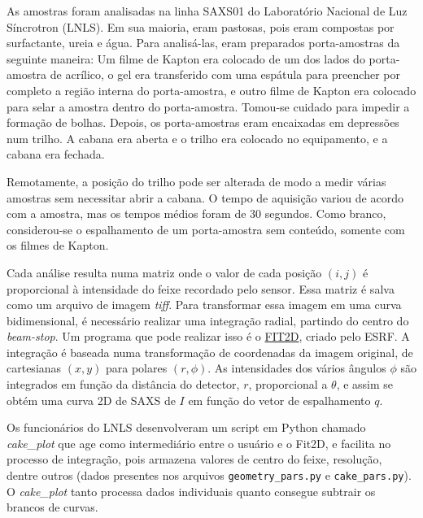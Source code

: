 			As amostras foram analisadas na linha SAXS01 do Laboratório Nacional de Luz Síncrotron (LNLS). Em sua maioria, eram pastosas, pois eram compostas por surfactante, ureia e água. Para analisá-las, eram preparados porta-amostras da seguinte maneira: Um filme de Kapton era colocado de um dos lados do porta-amostra de acrílico, o gel era transferido com uma espátula para preencher por completo a região interna do porta-amostra, e outro filme de Kapton era colocado para selar a amostra dentro do porta-amostra. Tomou-se cuidado para impedir a formação de bolhas. Depois, os porta-amostras eram encaixadas em depressões num trilho. A cabana era aberta e o trilho era colocado no equipamento, e a cabana era fechada. %
					
			Remotamente, a posição do trilho pode ser alterada de modo a medir várias amostras sem necessitar abrir a cabana. O tempo de aquisição variou de acordo com a amostra, mas os tempos médios foram de 30 segundos. Como branco, considerou-se o espalhamento de um porta-amostra sem conteúdo, somente com os filmes de Kapton.
			
			Cada análise resulta numa matriz onde o valor de cada posição \((i, j)\) é proporcional à intensidade do feixe recordado pelo sensor. Essa matriz é salva como um arquivo de imagem \emph{tiff}. Para transformar essa imagem em uma curva bidimensional, é necessário realizar uma integração radial, partindo do centro do \emph{beam-stop}. Um programa que pode realizar isso é o \href{http://www.esrf.eu/computing/scientific/FIT2D/windows.html}{FIT2D}, criado pelo ESRF. A integração é baseada numa transformação de coordenadas da imagem original, de cartesianas \((x, y)\) para polares \((r, \phi)\). As intensidades dos vários ângulos \(\phi\) são integrados em função da distância do detector, \(r\), proporcional a \(\theta\), e assim se obtém uma curva 2D de SAXS de \(I\) em função do vetor de espalhamento \(q\). 
			
			Os funcionários do LNLS desenvolveram um script em Python chamado \emph{cake\_plot} que age como intermediário entre o usuário e o Fit2D, e facilita no processo de integração, pois armazena valores de centro do feixe, resolução, dentre outros (dados presentes nos arquivos \texttt{geometry\_pars.py} e \texttt{cake\_pars.py}). O \emph{cake\_plot} tanto processa dados individuais quanto consegue subtrair os brancos de curvas.
			
